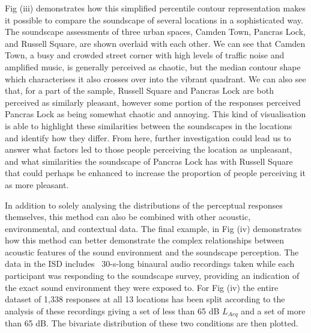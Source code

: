 Fig (iii) demonstrates how this simplified  percentile contour representation makes it possible to compare the soundscape of several locations in a sophisticated way. The soundscape assessments of three urban spaces, Camden Town, Pancras Lock, and Russell Square, are shown overlaid with each other. We can see that Camden Town, a busy and crowded street corner with high levels of traffic noise and amplified music, is generally perceived as chaotic, but the median contour shape which characterises it also crosses over into the vibrant quadrant. We can also see that, for a part of the sample, Russell Square and Pancras Lock are both perceived as similarly pleasant, however some portion of the responses perceived Pancras Lock as being somewhat chaotic and annoying. This kind of visualisation is able to highlight these similarities between the soundscapes in the locations and identify how they differ. From here, further investigation could lead us to answer what factors led to those people perceiving the location as unpleasant, and what similarities the soundscape of Pancras Lock has with Russell Square that could perhaps be enhanced to increase the proportion of people perceiving it as more pleasant.

In addition to solely analysing the distributions of the perceptual responses themselves, this method can also be combined with other acoustic, environmental, and contextual data. The final example, in Fig (iv) demonstrates how this method can better demonstrate the complex relationships between acoustic features of the sound environment and the soundscape perception. The data in the ISD includes ~30-s-long binaural audio recordings taken while each participant was responding to the soundscape survey, providing an indication of the exact sound environment they were exposed to. For Fig (iv) the entire dataset of 1,338 responses at all 13 locations has been split according to the analysis of these recordings giving a set of less than 65 dB $L_{Aeq}$ and a set of more than 65 dB. The bivariate distribution of these two conditions are then plotted.

